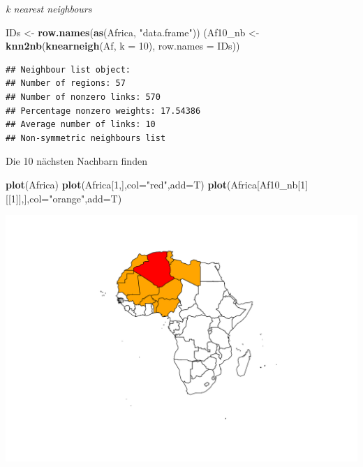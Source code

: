 \documentclass[ignorenonframetext,]{beamer}
\newenvironment{Shaded}{\begin{snugshade}}{\end{snugshade}}
\newcommand{\DataTypeTok}[1]{\textcolor[rgb]{0.13,0.29,0.53}{#1}}
\newcommand{\DecValTok}[1]{\textcolor[rgb]{0.00,0.00,0.81}{#1}}
\newcommand{\KeywordTok}[1]{\textcolor[rgb]{0.13,0.29,0.53}{\textbf{#1}}}
\newcommand{\NormalTok}[1]{#1}
\newcommand{\StringTok}[1]{\textcolor[rgb]{0.31,0.60,0.02}{#1}}
\begin{document}
\begin{frame}[fragile]{\emph{k nearest neighbours}}
\protect\hypertarget{k-nearest-neighbours}{}

\begin{Shaded}
\begin{Highlighting}[]
\NormalTok{IDs <-}\StringTok{ }\KeywordTok{row.names}\NormalTok{(}\KeywordTok{as}\NormalTok{(Africa, }\StringTok{"data.frame"}\NormalTok{))}
\NormalTok{(Af10_nb <-}\StringTok{ }\KeywordTok{knn2nb}\NormalTok{(}\KeywordTok{knearneigh}\NormalTok{(Af, }\DataTypeTok{k =} \DecValTok{10}\NormalTok{), }\DataTypeTok{row.names =}\NormalTok{ IDs))}
\end{Highlighting}
\end{Shaded}

\begin{verbatim}
## Neighbour list object:
## Number of regions: 57 
## Number of nonzero links: 570 
## Percentage nonzero weights: 17.54386 
## Average number of links: 10 
## Non-symmetric neighbours list
\end{verbatim}

\end{frame}

\begin{frame}[fragile]{Die 10 nächsten Nachbarn finden}
\protect\hypertarget{die-10-nachsten-nachbarn-finden}{}

\begin{Shaded}
\begin{Highlighting}[]
\KeywordTok{plot}\NormalTok{(Africa)}
\KeywordTok{plot}\NormalTok{(Africa[}\DecValTok{1}\NormalTok{,],}\DataTypeTok{col=}\StringTok{"red"}\NormalTok{,}\DataTypeTok{add=}\NormalTok{T)}
\KeywordTok{plot}\NormalTok{(Africa[Af10_nb[}\DecValTok{1}\NormalTok{][[}\DecValTok{1}\NormalTok{]],],}\DataTypeTok{col=}\StringTok{"orange"}\NormalTok{,}\DataTypeTok{add=}\NormalTok{T)}
\end{Highlighting}
\end{Shaded}

\includegraphics{A7_spdep_files/figure-beamer/unnamed-chunk-17-1.pdf}

\end{frame}
\end{document}

